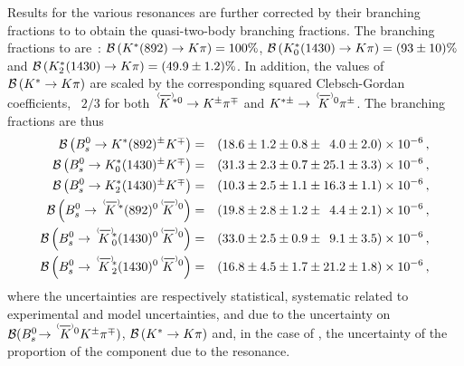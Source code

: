 Results for the various \Kstar resonances are further corrected by their branching fractions to \kpi to obtain the quasi-two-body branching fractions.
The branching fractions to \kpi are~\cite{PDG2017}: ${\mathcal{B}}\left({{K}^*}(892) \rightarrow {\ensuremath{K}}{\ensuremath{\pi}}\right) = 100\%$, ${\mathcal{B}}\left({K}^*_0(1430) \rightarrow {\ensuremath{K}}{\ensuremath{\pi}}\right) = (93 \pm 10)\%$ and ${\mathcal{B}}\left({K}^*_2(1430) \rightarrow {\ensuremath{K}}{\ensuremath{\pi}}\right) = (49.9 \pm 1.2)\%$.
In addition, the values of ${\mathcal{B}}\left(K^{*} \rightarrow K \pi\right)$ are scaled by the corresponding squared Clebsch-Gordan coefficients, 
\ie\ $2/3$ for both $\KstarzorKstarzb \to \Kpm \pimp$ and $\Kstarpm \to \KorKbarz \pipm$. 
The branching fractions are thus
\begin{eqnarray*}      
\Br{\Bs\to \KstarIpm\Kmp}              &=& (18.6      \pm   1.2   \pm   0.8   \pm   \phz4.0   \pm   2.0)  \times 10^{-6} \,, \\
\Br{\Bs\to \KstarIIpm\Kmp}             &=& (31.3      \pm   2.3   \pm   0.7   \pm      25.1   \pm   3.3)  \times 10^{-6} \,, \\
\Br{\Bs\to \KstarIIIpm\Kmp}            &=& (10.3      \pm   2.5   \pm   1.1   \pm      16.3   \pm   1.1)  \times 10^{-6} \,, \\
\Br{\Bs \to \KstarIzoptbar\KorKbarz}   &=& (19.8      \pm   2.8   \pm   1.2   \pm   \phz4.4   \pm   2.1)  \times 10^{-6} \,, \\
\Br{\Bs \to \KstarIIzoptbar\KorKbarz}  &=& (33.0      \pm   2.5   \pm   0.9   \pm   \phz9.1   \pm   3.5)  \times 10^{-6} \,, \\
\Br{\Bs \to \KstarIIIzoptbar\KorKbarz} &=& (16.8      \pm   4.5   \pm   1.7   \pm      21.2   \pm   1.8)  \times 10^{-6} \,,
\end{eqnarray*}  
where the uncertainties are respectively statistical, systematic related to experimental and model uncertainties, and due to
the uncertainty on ${\cal{B}}(\BsToKzBarOptKpi)$, ${\mathcal{B}}\left({{K}^*}\rightarrow{\ensuremath{K}}{\ensuremath{\pi}}\right)$ and,
in the case of \KstarII, the uncertainty of the proportion of the \KpiS
component due to the \KstarII resonance.


